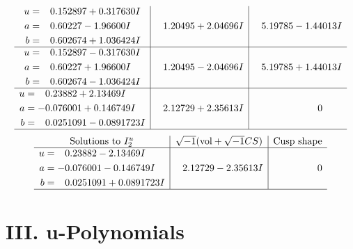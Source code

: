 \documentclass[1p]{elsarticle_modified}
\theoremstyle{definition}
\newcommand{\I}{\sqrt{-1}}
\begin{document}
$$\begin{array}{c|c|c}
\begin{aligned}
u &= \phantom{-}0.152897 + 0.317630 I \\
a &= \phantom{-}0.60227 - 1.96600 I \\
b &= \phantom{-}0.602674 + 1.036424 I\end{aligned}
 & \phantom{-}1.20495 + 2.04696 I & \phantom{-}5.19785 - 1.44013 I \\ \hline\begin{aligned}
u &= \phantom{-}0.152897 - 0.317630 I \\
a &= \phantom{-}0.60227 + 1.96600 I \\
b &= \phantom{-}0.602674 - 1.036424 I\end{aligned}
 & \phantom{-}1.20495 - 2.04696 I & \phantom{-}5.19785 + 1.44013 I \\ \hline\begin{aligned}
u &= \phantom{-}0.23882 + 2.13469 I \\
a &= -0.076001 + 0.146749 I \\
b &= \phantom{-}0.0251091 - 0.0891723 I\end{aligned}
 & \phantom{-}2.12729 + 2.35613 I & \phantom{-0.000000 } 0\\
 \hline 
 \end{array}$$\newpage$$\begin{array}{c|c|c}  
\text{Solutions to }I^u_{2}& \I (\text{vol} + \sqrt{-1}CS) & \text{Cusp shape}\\
 \hline 
\begin{aligned}
u &= \phantom{-}0.23882 - 2.13469 I \\
a &= -0.076001 - 0.146749 I \\
b &= \phantom{-}0.0251091 + 0.0891723 I\end{aligned}
 & \phantom{-}2.12729 - 2.35613 I & \phantom{-0.000000 } 0\\
 \hline 
 \end{array}$$\newpage
\newpage\renewcommand{\arraystretch}{1}
\centering \section*{ III. u-Polynomials}
\end{document}

